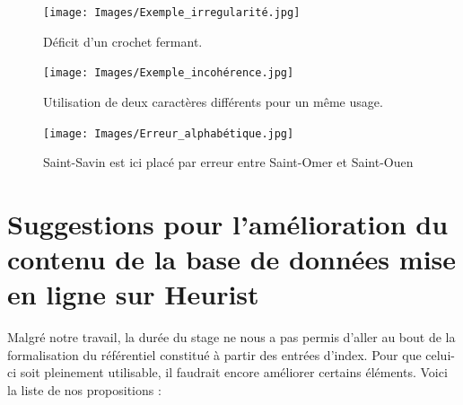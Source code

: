 \documentclass[a4paper,12pt,twoside]{book}
\begin{document}
	\begin{figure}
		\centering
		\texttt{[image: Images/Exemple\_irregularité.jpg]}
		\caption{Déficit d'un crochet fermant.}
		\label{Irregularité_crochets}
	\end{figure}

	\begin{figure}
		\centering
		\texttt{[image: Images/Exemple\_incohérence.jpg]}
		\caption{Utilisation de deux caractères différents pour un même usage.}
		\label{Marquage_non_systématique}
	\end{figure}

	\begin{figure}
		\centering
		\texttt{[image: Images/Erreur\_alphabétique.jpg]}
		\caption{\og Saint-Savin\fg{} est ici placé par erreur entre \og Saint-Omer\fg{} et \og Saint-Ouen\fg{}}
		\label{Erreur_alphabétique}
	\end{figure}
	
	\chapter{Suggestions pour l'amélioration du contenu de la base de données mise en ligne sur Heurist}
	
	Malgré notre travail, la durée du stage ne nous a pas permis d'aller au bout de la formalisation du référentiel constitué à partir des entrées d'index. Pour que celui-ci soit pleinement utilisable, il faudrait encore améliorer certains éléments. Voici la liste de nos propositions : 
	
\end{document}
